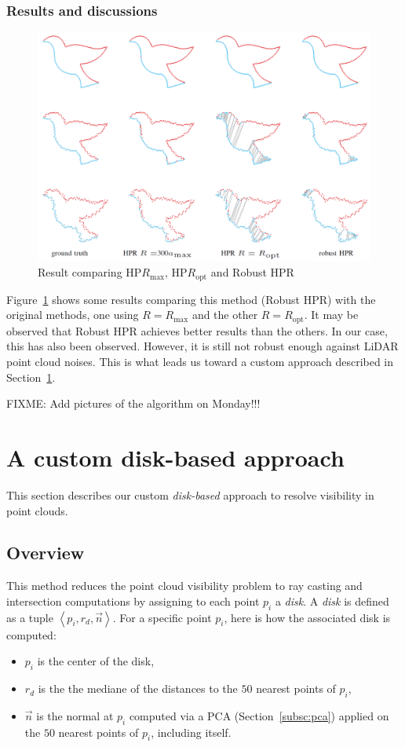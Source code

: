 \subsubsection{Results and discussions}
\begin{figure}[h]
  \centering
  \includegraphics[scale=0.35]{img/rhpr-result.png}
  \caption{Result comparing HP$R_\text{max}$, HP$R_\text{opt}$ and Robust HPR}
  \label{fig:rhpr-result}
\end{figure}

Figure~\ref{fig:rhpr-result} shows some results comparing this method (Robust HPR) with the original methods, one using $R = R_\text{max}$ and the other $R = R_\text{opt}$. It may be observed that Robust HPR achieves better results than the others. In our case, this has also been observed. However, it is still not robust enough against LiDAR point cloud noises. This is what leads us toward a custom approach described in Section~\ref{sc:custom}.

FIXME: Add pictures of the algorithm on Monday!!!

\section{A custom disk-based approach}
\label{sc:custom}
This section describes our custom \emph{disk-based} approach to resolve visibility in point clouds.

\subsection{Overview}
\label{subsc:custom-overview}
This method reduces the point cloud visibility problem to ray casting and intersection computations by assigning to each point $p_i$ a \emph{disk}. A \emph{disk} is defined as a tuple $\left\langle p_i, r_d, \vec{n} \right\rangle$. For a specific point $p_i$, here is how the associated disk is computed:
\begin{itemize}
  \item $p_i$ is the center of the disk,
  \item $r_d$ is the the mediane of the distances to the $50$ nearest points of $p_i$,
  \item $\vec{n}$ is the normal at $p_i$ computed via a PCA (Section~\ref{subsc:pca}) applied on the $50$ nearest points of $p_i$, including itself.
\end{itemize}

